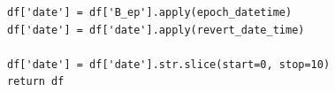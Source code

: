 \documentclass[USenglish]{uit-thesis}
\begin{document}
\begin{appendices}
\begin{lstlisting}
df['date'] = df['B_ep'].apply(epoch_datetime)
df['date'] = df['date'].apply(revert_date_time)

df['date'] = df['date'].str.slice(start=0, stop=10)
return df
	\end{lstlisting}
%
%
%

\end{appendices}
\end{document}
